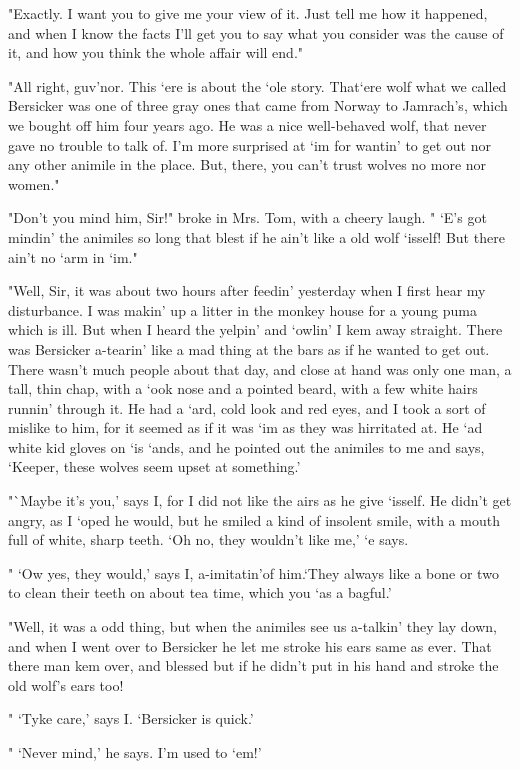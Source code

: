 "Exactly. I want you to give me your view of it. Just tell me how it happened, and when I know the facts I'll get you to say what you consider was the cause of it, and how you think the whole affair will end." 

"All right, guv'nor. This `ere is about the `ole story. That`ere wolf what we called Bersicker was one of three gray ones that came from Norway to Jamrach's, which we bought off him four years ago. He was a nice well-behaved wolf, that never gave no trouble to talk of. I'm more surprised at `im for wantin' to get out nor any other animile in the place. But, there, you can't trust wolves no more nor women." 

"Don't you mind him, Sir!" broke in Mrs. Tom, with a cheery laugh. " `E's got mindin' the animiles so long that blest if he ain't like a old wolf `isself! But there ain't no `arm in `im." 

"Well, Sir, it was about two hours after feedin' yesterday when I first hear my disturbance. I was makin' up a litter in the monkey house for a young puma which is ill. But when I heard the yelpin' and `owlin' I kem away straight. There was Bersicker a-tearin' like a mad thing at the bars as if he wanted to get out. There wasn't much people about that day, and close at hand was only one man, a tall, thin chap, with a `ook nose and a pointed beard, with a few white hairs runnin' through it. He had a `ard, cold look and red eyes, and I took a sort of mislike to him, for it seemed as if it was `im as they was hirritated at. He `ad white kid gloves on `is `ands, and he pointed out the animiles to me and says, `Keeper, these wolves seem upset at something.' 

"`Maybe it's you,' says I, for I did not like the airs as he give `isself. He didn't get angry, as I `oped he would, but he smiled a kind of insolent smile, with a mouth full of white, sharp teeth. `Oh no, they wouldn't like me,' `e says. 

" `Ow yes, they would,' says I, a-imitatin'of him.`They always like a bone or two to clean their teeth on about tea time, which you `as a bagful.' 

"Well, it was a odd thing, but when the animiles see us a-talkin' they lay down, and when I went over to Bersicker he let me stroke his ears same as ever. That there man kem over, and blessed but if he didn't put in his hand and stroke the old wolf's ears too! 

" `Tyke care,' says I. `Bersicker is quick.' 

" `Never mind,' he says. I'm used to `em!' 

